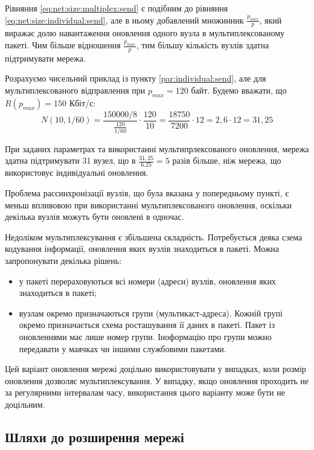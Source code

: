 \documentclass[a4paper,ukrainian,utf8,nocolumnsxix,floatsection,equationsection]{eskdtext}
\begin{document}
Рівняння \ref{eq:net:size:multiplex:send} є подібним до рівняння \ref{eq:net:size:individual:send}, але в ньому добавлений множинник $\frac{p_{max}}{p}$, який виражає долю навантаження оновлення одного вузла в мультиплексованому пакеті. Чим більше відношення $\frac{p_{max}}{p}$, тим більшу кількість вузлів здатна підтримувати мережа.

Розрахуємо чисельний приклад із пункту \ref{par:individual:send}, але для мультиплексованого відправлення при $p_{max} = 120$ байт. Будемо вважати, що $R(p_{max}) = 150$ Кбіт/с:
\begin{equation}
	N(10, 1/60) = \frac{150000 / 8}{\frac{120}{1/60}} \cdot \frac{120}{10} = 
		\frac{18750}{7200} \cdot 12 = 2,6 \cdot 12 = 31,25
\end{equation}

При заданих параметрах та використанні мультипрлексованого оновлення, мережа здатна підтримувати 31 вузел, що в $\frac{31,25}{6.25} = 5$ разів більше, ніж мережа, що використовує індивідуальні оновлення. 

Проблема рассинхронізації вузлів, що була вказана у попередньому пункті, є меньш впливовою при використанні мультиплексованого оновлення, оскільки декілька вузлів можуть бути оновлені в одночас.

Недоліком мультиплексування є збільшена складність. Потребується деяка сзема кодування інформації, оновлення яких вузлів знаходиться в пакеті. Можна запропонувати декілька рішень:

\begin{itemize}
	\item у пакеті перераховуються всі номери (адреси) вузлів, оновлення яких знаходиться в пакеті;
	\item вузлам окремо призначаються групи (мультикаст-адреса). Кожній групі окремо призначається схема росташування її даних в пакеті. Пакет із оновленнями має лише номер групи. Іноформацію про групи можно передавати у маячках чи іншими службовими пакетами.
\end{itemize}

Цей варіант оновлення мережі доцільно використовувати у випадках, коли розмір оновлення дозволяє мультиплексування. У випадку, якщо оновлення проходить не за регулярними інтервалам часу, використання цього варіанту може бути не доцільним.

\subsection{Шляхи до розширення мережі}
\end{document}

